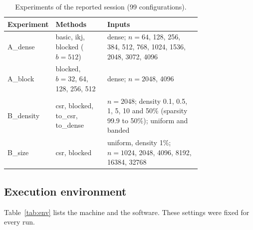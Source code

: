 \documentclass[11pt,a4paper]{article}
\begin{document}
\begin{table}[t]
\centering
\caption{Experiments of the reported session (99 configurations).}
\label{tab:experiments}
\small
\begin{tabular}{@{}l>{\raggedright\arraybackslash}p{0.27\linewidth}>{\raggedright\arraybackslash}p{0.5\linewidth}@{}}
\toprule
Experiment & Methods & Inputs \\
\midrule
A\_dense & basic, ikj, blocked ($b=512$) & dense; $n=64$, 128, 256, 384, 512, 768, 1024, 1536, 2048, 3072, 4096 \\
A\_block & blocked, $b=32$, 64, 128, 256, 512 & dense; $n=2048$, 4096 \\
B\_density & csr, blocked, to\_csr, to\_dense & $n=2048$; density 0.1, 0.5, 1, 5, 10 and 50\% (sparsity 99.9 to 50\%); uniform and banded \\
B\_size & csr, blocked & uniform, density 1\%; $n=1024$, 2048, 4096, 8192, 16384, 32768 \\
\bottomrule
\end{tabular}
\end{table}

\subsection{Execution environment}

Table~\ref{tab:env} lists the machine and the software. These settings were
fixed for every run.
\end{document}
